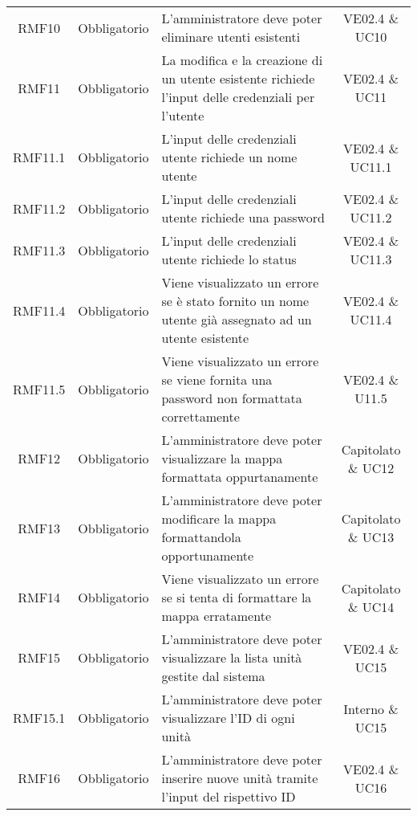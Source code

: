 \begin{longtable}[h!] { c c m{8cm} c}
		RMF10 & Obbligatorio & L'amministratore deve poter eliminare utenti esistenti & VE02.4 \& UC10 \\

		RMF11 & Obbligatorio & La modifica e la creazione di un utente esistente richiede l'input delle credenziali per l'utente & VE02.4 \& UC11 \\

		RMF11.1 & Obbligatorio & L'input delle credenziali utente richiede un nome utente & VE02.4 \& UC11.1 \\

		RMF11.2 & Obbligatorio & L'input delle credenziali utente richiede una password & VE02.4 \& UC11.2 \\

		RMF11.3 & Obbligatorio & L'input delle credenziali utente richiede lo status & VE02.4 \& UC11.3 \\

		RMF11.4 & Obbligatorio & Viene visualizzato un errore se è stato fornito un nome utente già assegnato ad un utente esistente & VE02.4 \& UC11.4 \\

		RMF11.5 & Obbligatorio & Viene visualizzato un errore se viene fornita una password non formattata correttamente & VE02.4 \& U11.5 \\

		RMF12 & Obbligatorio & L'amministratore deve poter visualizzare la mappa formattata oppurtanamente & Capitolato \& UC12 \\

		RMF13 & Obbligatorio & L'amministratore deve poter modificare la mappa formattandola opportunamente & Capitolato \& UC13 \\

		RMF14 & Obbligatorio & Viene visualizzato un errore se si tenta di formattare la mappa erratamente & Capitolato \& UC14 \\

		RMF15 & Obbligatorio & L'amministratore deve poter visualizzare la lista unità gestite dal sistema & VE02.4 \& UC15 \\

		RMF15.1 & Obbligatorio & L'amministratore deve poter visualizzare l'ID di ogni unità & Interno \& UC15 \\

		RMF16 & Obbligatorio & L'amministratore deve poter inserire nuove unità tramite l'input del rispettivo ID & VE02.4 \& UC16 \\


\end{longtable}
